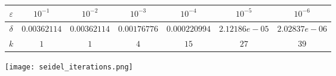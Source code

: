 \begin{tabular}{|c|cccccc|}
\hline
$\varepsilon$&$10^{-1}$&$10^{-2}$&$10^{-3}$&$10^{-4}$&$10^{-5}$&$10^{-6}$\\
\hline
$\delta$&$0.00362114
$&$0.00362114
$&$0.00176776
$&$0.000220994
$&$2.12186e-05
$&$2.02837e-06
$\\
\hline
$k$&$1
$&$1
$&$4
$&$15
$&$27
$&$39
$\\
\hline
\end{tabular}

\texttt{[image: seidel\_iterations.png]}